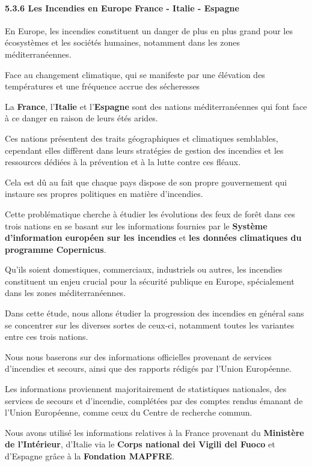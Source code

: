 \documentclass[
]{article}
\begin{document}
\paragraph{5.3.6 Les Incendies en Europe France - Italie -
Espagne}\label{les-incendies-en-europe-france---italie---espagne}

En Europe, les incendies constituent un danger de plus en plus grand
pour les écosystèmes et les sociétés humaines, notamment dans les zones
méditerranéennes.

Face au changement climatique, qui se manifeste par une élévation des
températures et une fréquence accrue des sécheresses

La \textbf{France}, l'\textbf{Italie} et l'\textbf{Espagne} sont des
nations méditerranéennes qui font face à ce danger en raison de leurs
étés arides.

Ces nations présentent des traits géographiques et climatiques
semblables, cependant elles diffèrent dans leurs stratégies de gestion
des incendies et les ressources dédiées à la prévention et à la lutte
contre ces fléaux.

Cela est dû au fait que chaque pays dispose de son propre gouvernement
qui instaure ses propres politiques en matière d'incendies.

Cette problématique cherche à étudier les évolutions des feux de forêt
dans ces trois nations en se basant sur les informations fournies par le
\textbf{Système d'information européen sur les incendies} et \textbf{les
données climatiques du programme Copernicus}.

Qu'ils soient domestiques, commerciaux, industriels ou autres, les
incendies constituent un enjeu crucial pour la sécurité publique en
Europe, spécialement dans les zones méditerranéennes.

Dans cette étude, nous allons étudier la progression des incendies en
général sans se concentrer sur les diverses sortes de ceux-ci, notamment
toutes les variantes entre ces trois nations.

Nous nous baserons sur des informations officielles provenant de
services d'incendies et secours, ainsi que des rapports rédigés par
l'Union Européenne.

Les informations proviennent majoritairement de statistiques nationales,
des services de secours et d'incendie, complétées par des comptes rendus
émanant de l'Union Européenne, comme ceux du Centre de recherche commun.

Nous avons utilisé les informations relatives à la France provenant du
\textbf{Ministère de l'Intérieur}, d'Italie via le \textbf{Corps
national dei Vigili del Fuoco} et d'Espagne grâce à la \textbf{Fondation
MAPFRE}.
\end{document}
